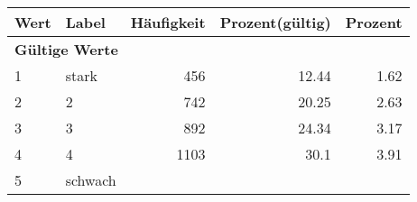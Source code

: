      \begin{longtable}{lXrrr}
     \toprule
     \textbf{Wert} & \textbf{Label} & \textbf{Häufigkeit} & \textbf{Prozent(gültig)} & \textbf{Prozent} \\
     \endhead
     \midrule
     \multicolumn{5}{l}{\textbf{Gültige Werte}}\\

     1 &
     \multicolumn{1}{X}{ stark   } &


       \num{456} &
       \num[round-mode=places,round-precision=2]{12.44} &
         \num[round-mode=places,round-precision=2]{1.62} \\

     2 &
     \multicolumn{1}{X}{ 2   } &


       \num{742} &
       \num[round-mode=places,round-precision=2]{20.25} &
         \num[round-mode=places,round-precision=2]{2.63} \\

     3 &
     \multicolumn{1}{X}{ 3   } &


       \num{892} &
       \num[round-mode=places,round-precision=2]{24.34} &
         \num[round-mode=places,round-precision=2]{3.17} \\

     4 &
     \multicolumn{1}{X}{ 4   } &


       \num{1103} &
       \num[round-mode=places,round-precision=2]{30.1} &
         \num[round-mode=places,round-precision=2]{3.91} \\

     5 &
     \multicolumn{1}{X}{ schwach   } &



\end{longtable}
